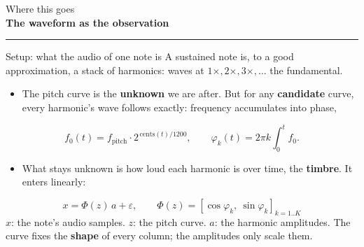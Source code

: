 \documentclass[aspectratio=169,11pt]{beamer}
\newcommand{\divider}[2]{\begin{frame}\centering\vfill
  {\small\textcolor{muted}{#1}}\\[2mm]
  {\LARGE\textbf{#2}}\\[4mm]
  {\color{okblue}\rule{62mm}{1.2pt}}\vfill\end{frame}}
\begin{document}














\divider{Where this goes}{The waveform as the observation}

\begin{frame}{Setup: what the audio of one note is}
  A sustained note is, to a good approximation, a stack of harmonics:
  waves at $1\times, 2\times, 3\times, \ldots$ the fundamental.
  \begin{itemize}
    \item The pitch curve is the \textbf{unknown} we are after. But for
          any \textbf{candidate} curve, every harmonic's wave follows
          exactly: frequency accumulates into phase,
  \end{itemize}
  \begin{equation*}
    f_0(t) = f_{\text{pitch}} \cdot 2^{\,\mathrm{cents}(t)/1200},
    \qquad
    \varphi_k(t) = 2\pi k \!\int_0^t\! f_0 .
  \end{equation*}
  \begin{itemize}
    \item What stays unknown is how loud each harmonic is over time,
          the \textbf{timbre}. It enters linearly:
  \end{itemize}
  \begin{equation*}
    x = \Phi(z)\, a + \varepsilon,
    \qquad
    \Phi(z) = [\cos\varphi_k,\ \sin\varphi_k]_{k = 1..K}
  \end{equation*}
  {\small $x$: the note's audio samples. $z$: the pitch curve. $a$: the
  harmonic amplitudes. The curve fixes the \textbf{shape} of every
  column; the amplitudes only scale them.}
\end{frame}
\end{document}
